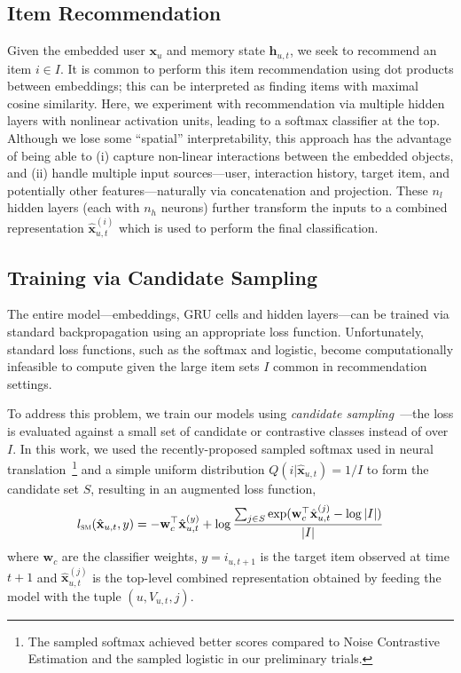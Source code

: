 \documentclass{sig-alternate-05-2015}
\newcommand{\mat}[1]{\mathbf{#1}}
\newcommand{\hatmat}[1]{\hat{\mathbf{#1}}}
\begin{document}
\subsection{Item Recommendation}
Given the embedded user $\mat{x}_u$ and memory state $\mat{h}_{u,t}$, we seek to recommend an item $i \in I$. It is common to perform this item recommendation using dot products between embeddings; this can be interpreted as finding items with maximal cosine similarity. Here, we experiment with recommendation via multiple hidden layers with nonlinear activation units, leading to a softmax classifier at the top. Although we lose some ``spatial'' interpretability, this approach has the advantage of being able to (i) capture non-linear interactions between the embedded objects, and (ii) handle multiple input sources---user, interaction history, target item, and potentially other features---naturally via concatenation and projection. These $n_l$ hidden layers (each with $n_h$ neurons) further transform the inputs to a combined representation $\hatmat{x}^{(i)}_{u,t}$ which is used to perform the final classification.
   
\subsection{Training via Candidate Sampling}
\label{sec:training}
The entire model---embeddings, GRU cells and hidden layers---can be trained via standard backpropagation using an appropriate loss function. Unfortunately, standard loss functions, such as the softmax and logistic, become computationally infeasible to compute given the large item sets $I$ common in recommendation settings.

To address this problem, we train our models using \emph{candidate sampling}~\cite{TFCandidateSampling}---the loss is evaluated against a small set of candidate or contrastive classes instead of over $I$. In  this work, we used the recently-proposed sampled softmax used in neural translation~\cite{Jean2015}\footnote{The sampled softmax achieved better scores compared to Noise Contrastive Estimation and the sampled logistic in our preliminary trials.} and a simple uniform distribution $Q(i|\hatmat{x}_{u,t}) = 1/I$ to form the candidate set $S$, resulting in an augmented loss function,
\begin{align}
	l_{\textsc{sm}}(\hatmat{x}_{u,t}, y) = -\mat{w}_c^{\top}\hatmat{x}^{(y)}_{u,t} + \log \frac{\sum_{j\in S} \exp(\mat{w}_c^{\top}\hatmat{x}^{(j)}_{u,t} - \log|I|)}{|I|} 
\end{align}
where $\mat{w}_c$ are the classifier weights, $y = i_{u,t+1}$ is the target item observed at time $t+1$ and $\hatmat{x}_{u,t}^{(j)}$ is the top-level combined representation obtained by feeding the model with the tuple $(u, V_{u,t}, j)$.
\end{document}
